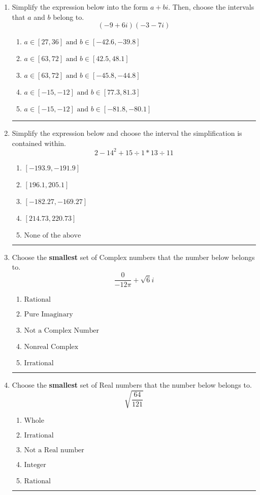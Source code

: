 \documentclass[14pt]{extbook}
\newcommand{\litem}[1]{\item#1\hspace*{-1cm}\rule{\textwidth}{0.4pt}}
\begin{document}
\begin{enumerate}
{\begin{enumerate}[label=\Alph*.]
\end{enumerate} }
\litem{
Simplify the expression below into the form $a+bi$. Then, choose the intervals that $a$ and $b$ belong to.\[ (-9 + 6 i)(-3 - 7 i) \]\begin{enumerate}[label=\Alph*.]
\item \( a \in [27, 36] \text{ and } b \in [-42.6, -39.8] \)
\item \( a \in [63, 72] \text{ and } b \in [42.5, 48.1] \)
\item \( a \in [63, 72] \text{ and } b \in [-45.8, -44.8] \)
\item \( a \in [-15, -12] \text{ and } b \in [77.3, 81.3] \)
\item \( a \in [-15, -12] \text{ and } b \in [-81.8, -80.1] \)

\end{enumerate} }
\litem{
Simplify the expression below and choose the interval the simplification is contained within.\[ 2 - 14^2 + 15 \div 1 * 13 \div 11 \]\begin{enumerate}[label=\Alph*.]
\item \( [-193.9, -191.9] \)
\item \( [196.1, 205.1] \)
\item \( [-182.27, -169.27] \)
\item \( [214.73, 220.73] \)
\item \( \text{None of the above} \)

\end{enumerate} }
\litem{
Choose the \textbf{smallest} set of Complex numbers that the number below belongs to.\[ \frac{0}{-12 \pi}+\sqrt{6}i \]\begin{enumerate}[label=\Alph*.]
\item \( \text{Rational} \)
\item \( \text{Pure Imaginary} \)
\item \( \text{Not a Complex Number} \)
\item \( \text{Nonreal Complex} \)
\item \( \text{Irrational} \)

\end{enumerate} }
\litem{
Choose the \textbf{smallest} set of Real numbers that the number below belongs to.\[ \sqrt{\frac{64}{121}} \]\begin{enumerate}[label=\Alph*.]
\item \( \text{Whole} \)
\item \( \text{Irrational} \)
\item \( \text{Not a Real number} \)
\item \( \text{Integer} \)
\item \( \text{Rational} \)


\end{enumerate}}
\end{enumerate}
\end{document}
